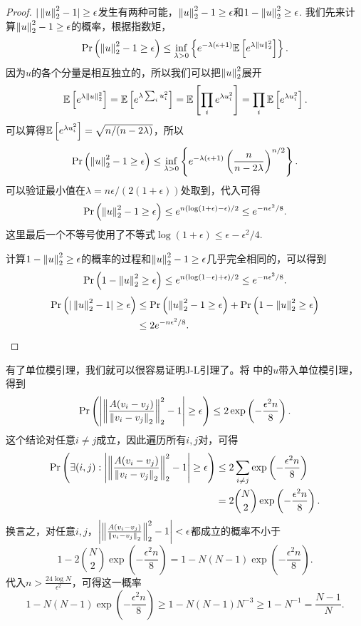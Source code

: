 \begin{proof}
$|\left\|u\right\|_2^2 - 1| \geq \epsilon$发生有两种可能，$ \left\|u\right\|_2^2 - 1 \geq \epsilon$和$ 1 - \left\|u\right\|_2^2 \geq \epsilon$. 我们先来计算$ \left\|u\right\|_2^2 - 1 \geq \epsilon$的概率，根据指数矩，
    \[
    \Pr\left(\left\|u\right\|_2^2 - 1 \geq \epsilon\right) \leq \inf_{\lambda > 0} \left\{e^{- \lambda (\epsilon + 1)} \mathbb{E} \left[e^{\lambda \left\|u\right\|_2^2}\right]\right\}. 
    \]
因为$u$的各个分量是相互独立的，所以我们可以把$\left\|u\right\|_2^2$展开
    \[
    \mathbb{E}\left[e^{\lambda \left\|u\right\|_2^2}\right] = \mathbb{E}\left[e^{\lambda \sum_i u_i^2}\right] = \mathbb{E}\left[\prod_i e^{\lambda u_i^2}\right] = \prod_i \mathbb{E}\left[e^{\lambda u_i^2}\right]. 
    \]
可以算得$\mathbb{E}\left[e^{\lambda u_i^2}\right]= \sqrt{n/(n-2\lambda)}$，所以
    \[
    \Pr\left(\left\|u\right\|_2^2 - 1 \geq \epsilon\right) \leq \inf_{\lambda > 0} \left\{e^{- \lambda (\epsilon + 1)} \left(\frac{n}{n-2\lambda} \right)^{n/2}\right\}. 
    \]
可以验证最小值在$\lambda = n\epsilon/(2(1+\epsilon))$处取到，代入可得
    \[
    \Pr\left(\left\|u\right\|_2^2 - 1 \geq \epsilon\right) \leq e^{n(\log (1+\epsilon) - \epsilon)/2} \leq e^{-n\epsilon^2/8}. 
    \]
这里最后一个不等号使用了不等式$\log(1+\epsilon)\leq\epsilon-\epsilon^2/4$. 

计算$1 - \left\|u\right\|_2^2 \geq \epsilon$的概率的过程和$\left\|u\right\|_2^2 - 1 \geq \epsilon$几乎完全相同的，可以得到
    \[
    \Pr\left(1 - \left\|u\right\|_2^2 \geq \epsilon\right) \leq e^{n(\log (1-\epsilon) + \epsilon)/2} \leq e^{-n\epsilon^2/8}. 
    \]
    \begin{align*}
        \Pr\left(| \left\|u\right\|_2^2 - 1| \geq \epsilon\right) &\leq \Pr\left(\left\|u\right\|_2^2 - 1 \geq \epsilon\right) + \Pr\left(1 - \left\|u\right\|_2^2 \geq \epsilon\right) \\
        &\leq 2e^{-n\epsilon^2/8}. 
    \end{align*}
\end{proof}

有了单位模引理，我们就可以很容易证明J-L引理了。将 中的$u$带入单位模引理，得到
\[
    \Pr\left(\left|\left\|\frac{A(v_i-v_j)}{\left\|v_i-v_j\right\|_2}\right\|_2^2 - 1 \right| \geq \epsilon\right)\leq  2\exp \left(-\frac{\epsilon^2 n}{8}\right). 
\]
这个结论对任意$i\neq j$成立，因此遍历所有$i,j$对，可得
\[
\begin{aligned}
    \Pr\left(\exists (i,j): \left|\left\|\frac{A(v_i-v_j)}{\left\|v_i-v_j\right\|_2}\right\|_2^2 - 1 \right| \geq \epsilon\right)
    &\leq 2 \sum_{i\neq j} \exp \left(-\frac{\epsilon^2 n}{8}\right) \\
    &=  2  \binom{N}{2}\exp \left(-\frac{\epsilon^2 n}{8}\right). 
\end{aligned}
\]
换言之，对任意$i,j$，$\left|\left\|\frac{A(v_i-v_j)}{\left\|v_i-v_j\right\|_2}\right\|_2^2 - 1 \right| < \epsilon$都成立的概率不小于
\[
1 - 2  \binom{N}{2}\exp \left(-\frac{\epsilon^2 n}{8}\right) = 1 - N(N-1)\exp \left(-\frac{\epsilon^2 n}{8}\right). 
\]
代入$n > \frac{24\log N}{\epsilon^2}$，可得这一概率
\[
1 - N(N-1)\exp \left(-\frac{\epsilon^2 n}{8}\right) \geq 1 - N(N-1)N^{-3}\geq 1 - N^{-1} = \frac{N-1}{N}. 
\]

